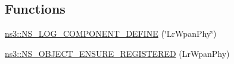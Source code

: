 \subsection*{Functions}
\begin{DoxyCompactItemize}
\item 
\hyperlink{namespacens3_ad098f56c44dde1d07f3baf36c3f2efeb}{ns3\+::\+N\+S\+\_\+\+L\+O\+G\+\_\+\+C\+O\+M\+P\+O\+N\+E\+N\+T\+\_\+\+D\+E\+F\+I\+NE} (\char`\"{}Lr\+Wpan\+Phy\char`\"{})
\item 
\hyperlink{namespacens3_a6e436933d55ed165a678b7ced734b049}{ns3\+::\+N\+S\+\_\+\+O\+B\+J\+E\+C\+T\+\_\+\+E\+N\+S\+U\+R\+E\+\_\+\+R\+E\+G\+I\+S\+T\+E\+R\+ED} (Lr\+Wpan\+Phy)
\end{DoxyCompactItemize}
